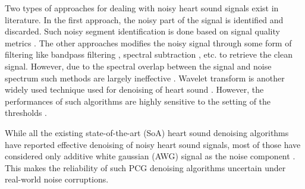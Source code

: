 \documentclass[sigconf,screen]{acmart}
\begin{document}
Two types of approaches for dealing with noisy heart sound signals exist in literature. In the first approach, the noisy part of the signal is identified and discarded. Such noisy segment identification is done based on signal quality metrics \cite{springer2014signal}. The other approaches modifies the noisy signal through some form of filtering like bandpass filtering \cite{de2007automated}, spectral subtraction \cite{ tosanguan2008modified, paul2006noise}, etc. to retrieve the clean signal. However, due to the spectral overlap between the signal and noise spectrum such methods are largely ineffective \cite{asmare2021can}. Wavelet transform is another widely used technique used for denoising of heart sound \cite{ agrawal2013wavelet, messer2001optimal}. However, the performances of such algorithms are highly sensitive to the setting of the thresholds \cite{asmare2021can}. 

While all the existing state-of-the-art (SoA) heart sound denoising algorithms have reported effective denoising of  noisy heart sound signals, most of those have considered only additive white gaussian (AWG) signal as the noise component \cite{asmare2021can}. This makes the reliability of such PCG denoising algorithms uncertain under real-world noise corruptions. 
\end{document}
